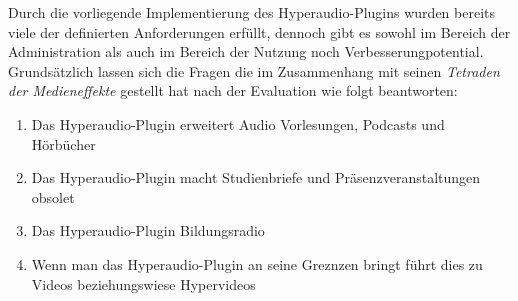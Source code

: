 Durch die vorliegende Implementierung des Hyperaudio-Plugins wurden bereits viele der definierten Anforderungen erfüllt, dennoch gibt es sowohl im Bereich der Administration als auch im Bereich der Nutzung noch Verbesserungpotential. Grundsätzlich lassen sich die Fragen die \cite{mcluhan1977laws} im Zusammenhang mit seinen \textit{Tetraden der Medieneffekte} gestellt hat nach der Evaluation wie folgt beantworten:

\begin{enumerate}
\item Das Hyperaudio-Plugin erweitert Audio Vorlesungen, Podcasts und Hörbücher
\item Das Hyperaudio-Plugin macht Studienbriefe und Präsenzveranstaltungen obsolet
\item Das Hyperaudio-Plugin Bildungsradio
\item Wenn man das Hyperaudio-Plugin an seine Greznzen bringt führt dies zu Videos beziehungswiese Hypervideos
\end{enumerate}





